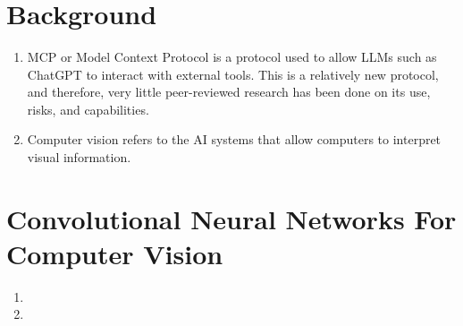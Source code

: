 \documentclass[12pt]{article}
\begin{document}
 

\begin{flushleft} 
 \\ 
 \\ 
 \\ 
\end{flushleft} 
\section{Background}
\begin{enumerate}
\item MCP or Model Context Protocol is a protocol used to allow LLMs such as ChatGPT to interact with external tools. This is a 
relatively new protocol, and therefore, very little peer-reviewed research has been done on its use, risks, and capabilities. 
\item Computer vision refers to the AI systems that allow computers to interpret visual information.
\end{enumerate} 

\section{Convolutional Neural Networks For Computer Vision}
\begin{enumerate}
\item 
\item 
\end{enumerate} 
\end{document}
